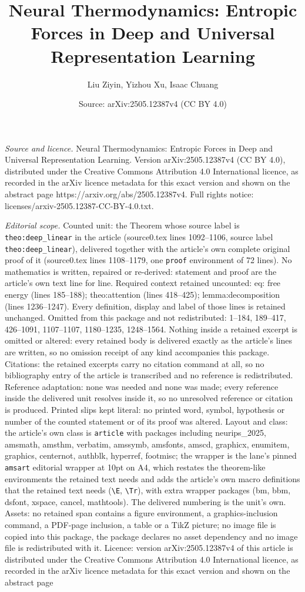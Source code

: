 \documentclass[10pt,a4paper]{amsart}
\title[Neural Thermodynamics: Entropic Forces in Deep and Universal]{Neural Thermodynamics: Entropic Forces in Deep and Universal Representation Learning}
\author{Liu Ziyin, Yizhou Xu, Isaac Chuang}
\date{Source: arXiv:2505.12387v4 (CC BY 4.0)}
\begin{document}
\maketitle

\noindent\emph{Source and licence.} Neural Thermodynamics: Entropic Forces in Deep and Universal Representation Learning. Version arXiv:2505.12387v4 (CC BY 4.0), distributed under the Creative Commons Attribution 4.0 International licence, as recorded in the arXiv licence metadata for this exact version and shown on the abstract page https://arxiv.org/abs/2505.12387v4. Full rights notice: licenses/arxiv-2505.12387-CC-BY-4.0.txt.\par\smallskip

\noindent\textit{Editorial scope.} Counted unit: the Theorem whose source label is \texttt{theo:deep\_linear} in the article (source0.tex lines 1092--1106, source label \texttt{theo:deep\_linear}), delivered together with the article's own complete original proof of it (source0.tex lines 1108--1179, one \texttt{proof} environment of 72 lines). No mathematics is written, repaired or re-derived: statement and proof are the article's own text line for line. Required context retained uncounted: eq: free energy (lines 185--188); theo:attention (lines 418--425); lemma:decomposition (lines 1236--1247). Every definition, display and label of those lines is retained unchanged. Omitted from this package and not redistributed: 1--184, 189--417, 426--1091, 1107--1107, 1180--1235, 1248--1564. Nothing inside a retained excerpt is omitted or altered: every retained body is delivered exactly as the article's lines are written, so no omission receipt of any kind accompanies this package. Citations: the retained excerpts carry no citation command at all, so no bibliography entry of the article is transcribed and no reference is redistributed. Reference adaptation: none was needed and none was made; every reference inside the delivered unit resolves inside it, so no unresolved reference or citation is produced. Printed slips kept literal: no printed word, symbol, hypothesis or number of the counted statement or of its proof was altered. Layout and class: the article's own class is \texttt{article} with packages including neurips\_2025, amsmath, amsthm, verbatim, amssymb, amsfonts, amscd, graphicx, enumitem, graphics, centernot, authblk, hyperref, footmisc; the wrapper is the lane's pinned \texttt{amsart} editorial wrapper at 10pt on A4, which restates the theorem-like environments the retained text needs and adds the article's own macro definitions that the retained text needs (\texttt{\textbackslash E}, \texttt{\textbackslash Tr}), with extra wrapper packages (bm, bbm, dsfont, xspace, cancel, mathtools). The delivered numbering is the unit's own. Assets: no retained span contains a figure environment, a graphics-inclusion command, a PDF-page inclusion, a table or a TikZ picture; no image file is copied into this package, the package declares no asset dependency and no image file is redistributed with it. Licence: version arXiv:2505.12387v4 of this article is distributed under the Creative Commons Attribution 4.0 International licence, as recorded in the arXiv licence metadata for this exact version and shown on the abstract page 
\end{document}
